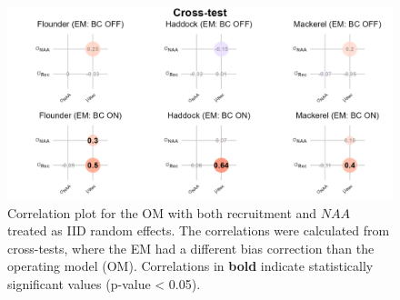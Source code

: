 \documentclass[
  12pt,
]{article}
\begin{document}
\begin{figure}[H]
    \centering
    \includegraphics[width=\textwidth]{Revised_Figures&Tables/Correlation_plot_NAA_iid_mismatch.PNG}
    \caption{Correlation plot for the OM with both recruitment and $NAA$ treated as IID random effects. The correlations were calculated from cross-tests, where the EM had a different bias correction than the operating model (OM). Correlations in \textbf{bold} indicate statistically significant values (p-value < 0.05).}
    \label{fig:supp_Cor_NAA_iid_mis}
\end{figure}
\end{document}
